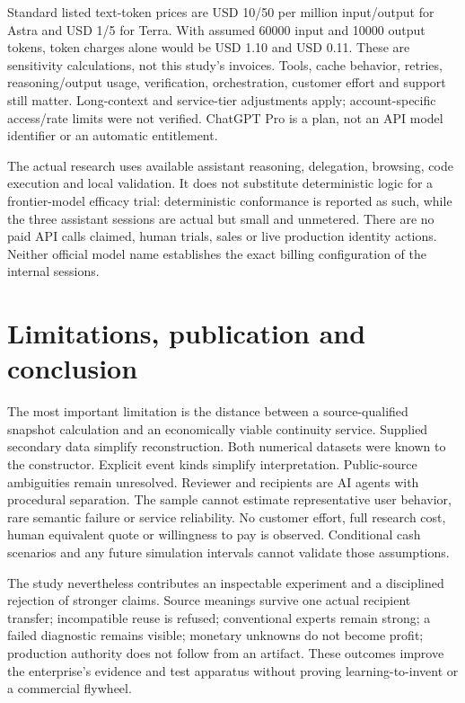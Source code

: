 \documentclass[11pt]{article}
\begin{document}
Standard listed text-token prices are USD 10/50 per million input/output for Astra and USD 1/5 for Terra. With assumed 60000 input and 10000 output tokens, token charges alone would be USD 1.10 and USD 0.11. These are sensitivity calculations, not this study's invoices. Tools, cache behavior, retries, reasoning/output usage, verification, orchestration, customer effort and support still matter. Long-context and service-tier adjustments apply; account-specific access/rate limits were not verified. ChatGPT Pro is a plan, not an API model identifier or an automatic entitlement.\citep{astra,terra,pricing}

The actual research uses available assistant reasoning, delegation, browsing, code execution and local validation. It does not substitute deterministic logic for a frontier-model efficacy trial: deterministic conformance is reported as such, while the three assistant sessions are actual but small and unmetered. There are no paid API calls claimed, human trials, sales or live production identity actions. Neither official model name establishes the exact billing configuration of the internal sessions.

\section{Limitations, publication and conclusion}

The most important limitation is the distance between a source-qualified snapshot calculation and an economically viable continuity service. Supplied secondary data simplify reconstruction. Both numerical datasets were known to the constructor. Explicit event kinds simplify interpretation. Public-source ambiguities remain unresolved. Reviewer and recipients are AI agents with procedural separation. The sample cannot estimate representative user behavior, rare semantic failure or service reliability. No customer effort, full research cost, human equivalent quote or willingness to pay is observed. Conditional cash scenarios and any future simulation intervals cannot validate those assumptions.

The study nevertheless contributes an inspectable experiment and a disciplined rejection of stronger claims. Source meanings survive one actual recipient transfer; incompatible reuse is refused; conventional experts remain strong; a failed diagnostic remains visible; monetary unknowns do not become profit; production authority does not follow from an artifact. These outcomes improve the enterprise's evidence and test apparatus without proving learning-to-invent or a commercial flywheel.
\end{document}
